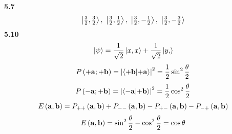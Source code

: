 \documentclass[english]{article}
\begin{document}
\begin{comment}
$$\ket{0,0}=\frac{1}{\sqrt{2}}\ket{+\vb{z},-\vb{z}}-\frac{1}{\sqrt{2}}\ket{-\vb{z},+\vb{z}}$$
$$\ket{+\vb{n}}=\cos\frac{\theta}{2}\ket{+\vb{z}}+e^{i\phi}\sin\frac{\theta}{2}\ket{-\vb{z}}$$
$$\ket{-\vb{n}}=\sin\frac{\theta}{2}\ket{+\vb{z}}-e^{i\phi}\cos\frac{\theta}{2}\ket{-\vb{z}}$$
$$\ket{0,0}=\frac{1}{\sqrt{2}}\left(\cos\frac{\theta}{2}\ket{+\vb{n}}+\sin\frac{\theta}{2}\ket{-\vb{n}}\right)\left(e^{i\phi}\sin\frac{\theta}{2}\ket{+\vb{n}}-e^{i\phi}\cos\frac{\theta}{2}\ket{-\vb{n}}\right)$$$$- \frac{1}{\sqrt{2}}\left(e^{i\phi}\sin\frac{\theta}{2}\ket{+\vb{n}}-e^{i\phi}\cos\frac{\theta}{2}\ket{-\vb{n}}\right)\left(\cos\frac{\theta}{2}\ket{+\vb{n}}+\sin\frac{\theta}{2}\ket{-\vb{n}}\right)$$
\[
\ket{0,0}=\frac{1}{\sqrt{2}}\left(
\begin{bmatrix}
\cos\tfrac{\theta}{2}e^{i\phi}\sin\tfrac{\theta}{2}\ket{+\vb{n},+\vb{n}} & -e^{i\phi}\cos^2\tfrac{\theta}{2}\ket{+\vb{n},-\vb{n}}\\
e^{i\phi}\sin^2\tfrac{\theta}{2}\ket{-\vb{n},+\vb{n}} & -\sin\tfrac{\theta}{2}e^{i\phi}\cos\tfrac{\theta}{2}\ket{-\vb{n},-\vb{n}}
\end{bmatrix}
-
\begin{bmatrix}
\cos\tfrac{\theta}{2}e^{i\phi}\sin\tfrac{\theta}{2}\ket{+\vb{n},+\vb{n}} & e^{i\phi}\sin^2\tfrac{\theta}{2}\ket{+\vb{n},-\vb{n}}\\
-e^{i\phi}\cos^2\tfrac{\theta}{2}\ket{-\vb{n},+\vb{n}} & -\sin\tfrac{\theta}{2}e^{i\phi}\cos\tfrac{\theta}{2}\ket{-\vb{n},-\vb{n}}
\end{bmatrix}
\right)
\]
\[
\ket{0,0}=\frac{1}{\sqrt{2}}
\begin{bmatrix}
0 & -e^{i\phi}\ket{+\vb{n},-\vb{n}}\\
e^{i\phi}\ket{-\vb{n},+\vb{n}} & 0
\end{bmatrix}
=\frac{e^{i\phi}}{\sqrt{2}}\ket{-\vb{n},+\vb{n}}-\frac{e^{i\phi}}{\sqrt{2}}\ket{+\vb{n},-\vb{n}}
\]
\end{comment}
\noindent
\textbf{5.7}\\
$$\ket{\tfrac{3}{2},\tfrac{3}{2}},\ \ket{\tfrac{3}{2},\tfrac{1}{2}},\ \ket{\tfrac{3}{2},-\tfrac{1}{2}},\ \ket{\tfrac{3}{2},-\tfrac{3}{2}}$$
\noindent
\textbf{5.10}\\
$$\ket{\psi}=\frac{1}{\sqrt{2}}\ket{x,x}+\frac{1}{\sqrt{2}}\ket{y,}$$
$$P\left(+\vb{a};+\vb{b}\right)=\left|\bra{+\vb{b}}\ket{+\vb{a}}\right|^2=\frac{1}{2}\sin^2 \frac{\theta}{2}$$
$$P\left(-\vb{a};+\vb{b}\right)=\left|\bra{-\vb{a}}\ket{+\vb{b}}\right|^2=\frac{1}{2}\cos^2 \frac{\theta}{2}$$
$$E\left(\vb{a},\vb{b}\right)=P_{++}\left(\vb{a},\vb{b}\right)+P_{--}\left(\vb{a},\vb{b}\right)-P_{+-}\left(\vb{a},\vb{b}\right)-P_{-+}\left(\vb{a},\vb{b}\right)$$
$$E\left(\vb{a},\vb{b}\right)=\sin^2\frac{\theta}{2}-\cos^2\frac{\theta}{2}=\cos\theta$$
\end{document}
